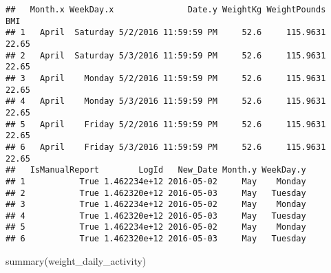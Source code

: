 \documentclass[
]{article}
\newenvironment{Shaded}{\begin{snugshade}}{\end{snugshade}}
\newcommand{\FunctionTok}[1]{\textcolor[rgb]{0.00,0.00,0.00}{#1}}
\newcommand{\NormalTok}[1]{#1}
\begin{document}
\begin{verbatim}
##   Month.x WeekDay.x               Date.y WeightKg WeightPounds   BMI
## 1   April  Saturday 5/2/2016 11:59:59 PM     52.6     115.9631 22.65
## 2   April  Saturday 5/3/2016 11:59:59 PM     52.6     115.9631 22.65
## 3   April    Monday 5/2/2016 11:59:59 PM     52.6     115.9631 22.65
## 4   April    Monday 5/3/2016 11:59:59 PM     52.6     115.9631 22.65
## 5   April    Friday 5/2/2016 11:59:59 PM     52.6     115.9631 22.65
## 6   April    Friday 5/3/2016 11:59:59 PM     52.6     115.9631 22.65
##   IsManualReport        LogId   New_Date Month.y WeekDay.y
## 1           True 1.462234e+12 2016-05-02     May    Monday
## 2           True 1.462320e+12 2016-05-03     May   Tuesday
## 3           True 1.462234e+12 2016-05-02     May    Monday
## 4           True 1.462320e+12 2016-05-03     May   Tuesday
## 5           True 1.462234e+12 2016-05-02     May    Monday
## 6           True 1.462320e+12 2016-05-03     May   Tuesday
\end{verbatim}

\begin{Shaded}
\begin{Highlighting}[]
\FunctionTok{summary}\NormalTok{(weight\_daily\_activity)}
\end{Highlighting}
\end{Shaded}
\end{document}

